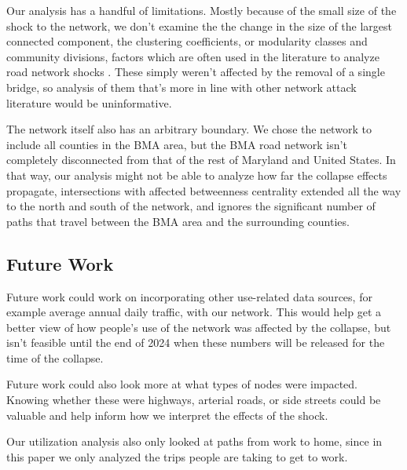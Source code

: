 \documentclass[11pt]{article}
\numberwithin{equation}{section} %
\numberwithin{figure}{section} %
\numberwithin{table}{section} %
\theoremstyle{definition}
\begin{document}
Our analysis has a handful of limitations. Mostly because of the small size of the shock to the network, we don't examine the the change in the size of the largest connected component, the clustering coefficients, or modularity classes and community divisions, factors which are often used in the literature to analyze road network shocks \parencites{Xeumei10}. These simply weren't affected by the removal of a single bridge, so analysis of them that's more in line with other network attack literature would be uninformative.

The network itself also has an arbitrary boundary. We chose the network to include all counties in the BMA area, but the BMA road network isn't completely disconnected from that of the rest of Maryland and United States. In that way, our analysis might not be able to analyze how far the collapse effects propagate, intersections with affected betweenness centrality extended all the way to the north and south of the network, and ignores the significant number of paths that travel between the BMA area and the surrounding counties.



\subsection{Future Work}

Future work could work on incorporating other use-related data sources, for example average annual daily traffic, with our network. This would help get a better view of how people's use of the network was affected by the collapse, but isn't feasible until the end of 2024 when these numbers will be released for the time of the collapse.

Future work could also look more at what types of nodes were impacted. Knowing whether these were highways, arterial roads, or side streets could be valuable and help inform how we interpret the effects of the shock.

Our utilization analysis also only looked at paths from work to home, since in this paper we only analyzed the trips people are taking to get to work.


\clearpage
\printbibliography
\end{document}
